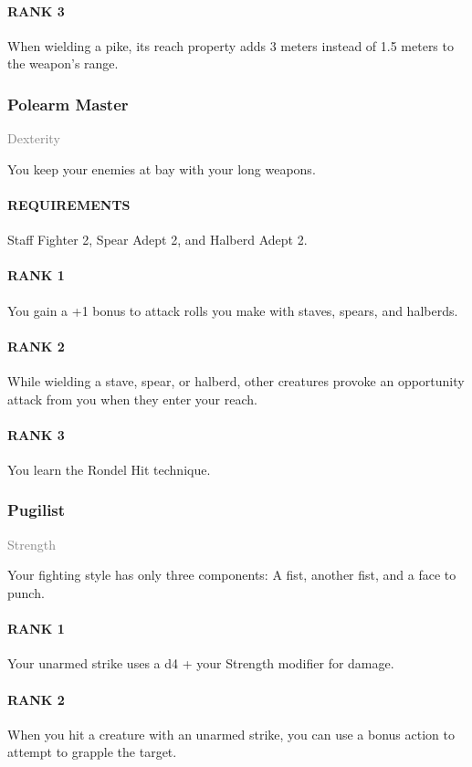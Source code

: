 \paragraph{RANK 3} When wielding a pike, its reach property adds 3 meters instead of 1.5 meters to the weapon's range.

\subsubsection{Polearm Master} \label{feat::polerarmmaster} %
\small{\textcolor{gray}{Dexterity}}

\normalsize
You keep your enemies at bay with your long weapons.
\paragraph{REQUIREMENTS} Staff Fighter 2, Spear Adept 2, and Halberd Adept 2.
\paragraph{RANK 1} You gain a +1 bonus to attack rolls you make with staves, spears, and halberds.
\paragraph{RANK 2} While wielding a stave, spear, or halberd, other creatures provoke an opportunity attack from you when they enter your reach.
\paragraph{RANK 3} You learn the Rondel Hit technique.

\subsubsection{Pugilist} \label{feat::pugilist}
\small{\textcolor{gray}{Strength}}

\normalsize
Your fighting style has only three components:
A fist, another fist, and a face to punch.
\paragraph{RANK 1} Your unarmed strike uses a d4 + your Strength modifier for damage.
\paragraph{RANK 2} When you hit a creature with an unarmed strike, you can use a bonus action to attempt to grapple the target.
